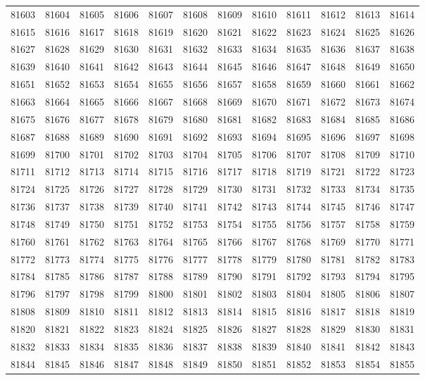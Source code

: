 \begin{center}
\begin{longtable}{llllllllllll}
81603 &81604 &81605 &81606 &81607 &81608 &81609 &81610 &81611 &81612 &81613 &81614 \\
81615 &81616 &81617 &81618 &81619 &81620 &81621 &81622 &81623 &81624 &81625 &81626 \\
81627 &81628 &81629 &81630 &81631 &81632 &81633 &81634 &81635 &81636 &81637 &81638 \\
81639 &81640 &81641 &81642 &81643 &81644 &81645 &81646 &81647 &81648 &81649 &81650 \\
81651 &81652 &81653 &81654 &81655 &81656 &81657 &81658 &81659 &81660 &81661 &81662 \\
81663 &81664 &81665 &81666 &81667 &81668 &81669 &81670 &81671 &81672 &81673 &81674 \\
81675 &81676 &81677 &81678 &81679 &81680 &81681 &81682 &81683 &81684 &81685 &81686 \\
81687 &81688 &81689 &81690 &81691 &81692 &81693 &81694 &81695 &81696 &81697 &81698 \\
81699 &81700 &81701 &81702 &81703 &81704 &81705 &81706 &81707 &81708 &81709 &81710 \\
81711 &81712 &81713 &81714 &81715 &81716 &81717 &81718 &81719 &81721 &81722 &81723 \\
81724 &81725 &81726 &81727 &81728 &81729 &81730 &81731 &81732 &81733 &81734 &81735 \\
81736 &81737 &81738 &81739 &81740 &81741 &81742 &81743 &81744 &81745 &81746 &81747 \\
81748 &81749 &81750 &81751 &81752 &81753 &81754 &81755 &81756 &81757 &81758 &81759 \\
81760 &81761 &81762 &81763 &81764 &81765 &81766 &81767 &81768 &81769 &81770 &81771 \\
81772 &81773 &81774 &81775 &81776 &81777 &81778 &81779 &81780 &81781 &81782 &81783 \\
81784 &81785 &81786 &81787 &81788 &81789 &81790 &81791 &81792 &81793 &81794 &81795 \\
81796 &81797 &81798 &81799 &81800 &81801 &81802 &81803 &81804 &81805 &81806 &81807 \\
81808 &81809 &81810 &81811 &81812 &81813 &81814 &81815 &81816 &81817 &81818 &81819 \\
81820 &81821 &81822 &81823 &81824 &81825 &81826 &81827 &81828 &81829 &81830 &81831 \\
81832 &81833 &81834 &81835 &81836 &81837 &81838 &81839 &81840 &81841 &81842 &81843 \\
81844 &81845 &81846 &81847 &81848 &81849 &81850 &81851 &81852 &81853 &81854 &81855 \\

\end{longtable}
\end{center}
